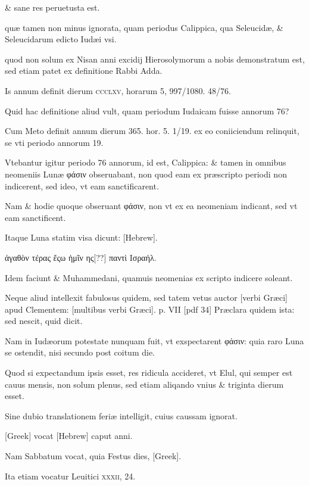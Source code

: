 \begin{parnumbers}
\& sane res peruetusta est.

quæ tamen non minus ignorata, quam periodus Calippica, qua Seleucidæ, \& Seleucidarum edicto Iudæi vsi.

quod non solum ex Nisan anni excidij Hierosolymorum a nobis demonstratum est, sed etiam patet ex definitione Rabbi Adda.

Is annum definit dierum \textsc{ccclxv}, horarum 5, 997/1080. 48/76.

Quid hac definitione aliud vult, quam periodum Iudaicam fuisse annorum 76?

Cum Meto definit annum dierum 365. hor. 5. 1/19. ex eo coniiciendum relinquit, se vti periodo annorum 19.

Vtebantur igitur periodo 76 annorum, id est, Calippica: \& tamen in omnibus neomeniis Lunæ \textgreek{φάσιν} obseruabant, non quod eam ex præscripto periodi non indicerent, sed ideo, vt eam sanctificarent.

Nam \& hodie quoque obseruant \textgreek{φάσιν}, non vt ex ea neomeniam indicant, sed vt eam sanctificent.

Itaque Luna statim visa dicunt: \texthebrew{[Hebrew]}.

\textgreek{ἀγαθὸν τέρας ἔςω ἡμῖν ης[??] παντὶ Ισραήλ.}

Idem faciunt \& Muhammedani, quamuis neomenias ex scripto indicere soleant.

Neque aliud intellexit fabulosus quidem, sed tatem vetus auctor \textgreek{[verbi Græci]} apud Clementem: \textgreek{[multibus verbi Græci]}.
\clearpage
p. VII [pdf 34]
Præclara quidem ista: sed nescit, quid dicit.

Nam in Iudæorum potestate nunquam fuit, vt exspectarent \textgreek{φάσιν}: quia raro Luna se ostendit, nisi secundo post coitum die.

Quod si expectandum ipsis esset, res ridicula accideret, vt Elul, qui semper est cauus mensis, non solum plenus, sed etiam aliqando vnius \& triginta dierum esset.

Sine dubio translationem feriæ intelligit, cuius caussam ignorat.

\textgreek{[Greek]} vocat \texthebrew{[Hebrew]} caput anni.

Nam Sabbatum vocat, quia Festus dies, \textgreek{[Greek]}.

Ita etiam vocatur Leuitici \textsc{xxxii}, 24.


\end{parnumbers}
